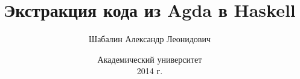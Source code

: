 \documentclass{beamer}
\title{Экстракция кода из Agda в Haskell}
\author{\scriptsize Шабалин Александр Леонидович}
\institute{{\tiny научный руководитель}\\
   \vspace{.10cm}к.~ф.-м.~н.~Москвин~Дeнис~Николаевич}
\date{\scriptsize Академический университет\\ \vspace{.10cm}2014 г.}
\begin{document}
\frame{\titlepage}


\end{document}
